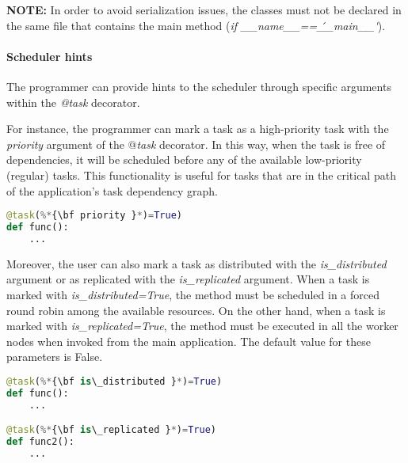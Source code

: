 \textbf{NOTE:} In order to avoid serialization issues, the classes must not be declared in the same file that contains 
the main method (\emph{if \_\_name\_\_==\'\_\_main\_\_\'}).

\vspace{-0.2cm}

\paragraph{Scheduler hints}

The programmer can provide hints to the scheduler through specific arguments within the {\it @task} decorator.

For instance, the programmer can mark a task as a high-priority task with the {\it priority} argument of the 
{\it $@$task} decorator. In this way, when the task is free of dependencies, it will be scheduled before 
any of the available low-priority (regular) tasks. This functionality is useful for tasks that are in 
the critical path of the application’s task dependency graph.

\vspace{-0.1cm}

\begin{lstlisting}[language=python]
@task(%*{\bf priority }*)=True)
def func():
    ...
\end{lstlisting}

\vspace{-0.2cm}

Moreover, the user can also mark a task as distributed with the {\it is\_distributed} argument or as 
replicated with the {\it is\_replicated} argument. When a task is marked with {\it is\_distributed=True}, 
the method must be scheduled in a forced round robin among the available resources.
On the other hand, when a task is marked with {\it is\_replicated=True}, the method must be executed in 
all the worker nodes when invoked from the main application.
The default value for these parameters is False.

\vspace{-0.1cm}

\begin{lstlisting}[language=python]
@task(%*{\bf is\_distributed }*)=True)
def func():
    ...

@task(%*{\bf is\_replicated }*)=True)
def func2():
    ...
\end{lstlisting}

\vspace{-0.2cm}


